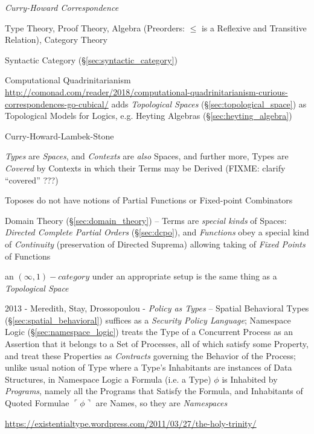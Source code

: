\emph{Curry-Howard Correspondence}

Type Theory, Proof Theory, Algebra (Preorders: $\leq$ is a Reflexive
and Transitive Relation), Category Theory

Syntactic Category (\S\ref{sec:syntactic_category}) %

Computational Quadrinitarianism
\url{http://comonad.com/reader/2018/computational-quadrinitarianism-curious-correspondences-go-cubical/}
adds \emph{Topological Spaces} (\S\ref{sec:topological_space}) as Topological
Models for Logics, e.g. Heyting Algebras (\S\ref{sec:heyting_algebra})

Curry-Howard-Lambek-Stone

\emph{Types} are \emph{Spaces}, and \emph{Contexts} are \emph{also} Spaces, and
further more, Types are \emph{Covered} by Contexts in which their Terms may be
Derived (FIXME: clarify ``covered'' ???)

Toposes do not have notions of Partial Functions or Fixed-point
Combinators

Domain Theory (\S\ref{sec:domain_theory}) -- Terms are \emph{special kinds} of
Spaces: \emph{Directed Complete Partial Orders} (\S\ref{sec:dcpo}), and
\emph{Functions} obey a special kind of \emph{Continuity} (preservation of
Directed Suprema) allowing taking of \emph{Fixed Points} of Functions

an $(\infty,1)-category$ under an appropriate setup is the same thing as a
\emph{Topological Space}

2013 - Meredith, Stay, Drossopoulou - \emph{Policy as Types} -- Spatial
Behavioral Types (\S\ref{sec:spatial_behavioral}) suffices as a \emph{Security
  Policy Language}; Namespace Logic (\S\ref{sec:namespace_logic}) treats the
Type of a Concurrent Process as an Assertion that it belongs to a Set of
Processes, all of which satisfy some Property, and treat these Properties as
\emph{Contracts} governing the Behavior of the Process; unlike usual notion of
Type where a Type's Inhabitants are instances of Data Structures, in Namespace
Logic a Formula (i.e. a Type) $\phi$ is Inhabited by \emph{Programs}, namely all
the Programs that Satisfy the Formula, and Inhabitants of Quoted Formulae
$\ulcorner\phi\urcorner$ are Names, so they are \emph{Namespaces}

\asterism

\url{https://existentialtype.wordpress.com/2011/03/27/the-holy-trinity/}

